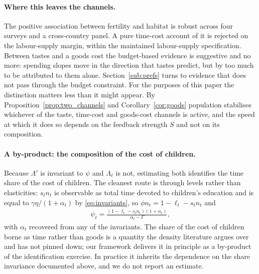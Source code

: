 \documentclass[11pt]{article}
\begin{document}
\paragraph{Where this leaves the channels.}
The positive association between fertility and habitat is robust across four surveys and a
cross-country panel.
A pure time-cost account of it is rejected on the labour-supply margin, within the maintained
labour-supply specification. Between tastes and a goods
cost the budget-based evidence is suggestive and no more: spending slopes move in the direction
that tastes predict, but by too much to be attributed to them alone.
Section~\ref{sub:prefs} turns to evidence that does not pass through the budget constraint.
For the purposes of this paper the distinction matters less than it might appear. By
Proposition~\ref{prop:two_channels} and Corollary~\ref{cor:goods} population stabilises whichever of the
taste, time-cost and goods-cost channels is active, and the speed at which it does so depends on the feedback strength $S$ and not
on its composition.

\paragraph{A by-product: the composition of the cost of children.}
Because $\Lambda'$ is invariant to $\psi$ and $\Lambda_\ell$ is not, estimating both identifies the
time share of the cost of children. The cleanest route is through levels rather than elasticities:
$s_tn_t$ is observable as total time devoted to children's education and is equal to
$\gamma\eta/(1+\alpha_t)$ by \eqref{eq:invariants}, so $\phi n_t=1-\ell_t-s_tn_t$ and
\begin{align}
\psi_t=\frac{\left(1-\ell_t-s_tn_t\right)\left(1+\alpha_t\right)}{\alpha_t-\Gamma},
\label{eq:psi_identified}
\end{align}
with $\alpha_t$ recovered from any of the invariants. The share of the cost of children borne as
time rather than goods is a quantity the density literature argues over and has not pinned down;
our framework delivers it in principle as a by-product of the identification exercise. In practice
it inherits the dependence on the share invariance documented above, and we do not report an
estimate.
\end{document}
